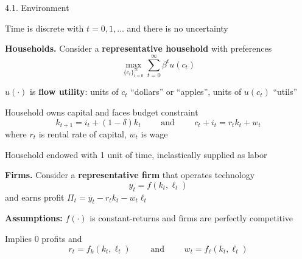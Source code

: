\documentclass[11pt, aspectratio=169]{beamer}
\newenvironment{witemize}{\itemize\addtolength{\itemsep}{10pt}}{\enditemize}
\begin{document}
\begin{frame}{4.1. Environment}

\begin{witemize}
\item Time is discrete with $t = 0, 1, \ldots$ and there is no uncertainty
\end{witemize}

\vspace{4mm}
\textbf{Households.} Consider a \textbf{representative household} with preferences
\begin{equation*}
	\max_{ \{ c_t \}_{t=0}^\infty } \sum_{t = 0}^\infty \beta^t u(c_t)
\end{equation*}

\begin{witemize}
\item $u(\cdot)$ is \textbf{flow utility}: units of $c_t$ ``dollars'' or ``apples'', units of $u(c_t)$ ``utils''

\item Household owns capital and faces budget constraint
\begin{equation*}
	k_{t+1} = i_t + (1 - \delta) k_t 
	\quad\quad \text{ and } \quad\quad
	c_t + i_t = r_t k_t + w_t
\end{equation*}
where $r_t$ is rental rate of capital, $w_t$ is wage

\item Household endowed with 1 unit of time, inelastically supplied as labor

\end{witemize}
\end{frame}



\begin{frame}{}

\vspace{4mm}
\textbf{Firms.} Consider a \textbf{representative firm} that operates technology 
\begin{equation*}
	y_t = f(k_t, \ell_t)
\end{equation*}
and earns profit $\Pi_t = y_t - r_t k_t - w_t \ell_t$ 

\vspace{5mm}
\begin{witemize}
\item \textbf{Assumptions:} $f(\cdot)$ is constant-returns and firms are perfectly competitive

\item Implies 0 profits and 
\begin{equation*}
	r_t = f_k(k_t, \ell_t) 
	\quad\quad \text{ and } \quad\quad
	w_t = f_\ell(k_t, \ell_t)
\end{equation*}

\end{witemize}
\end{frame}
\end{document}
